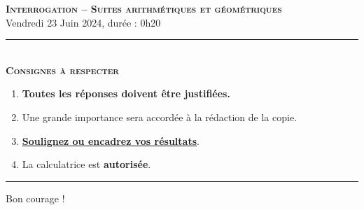 \documentclass[11pt]{article}
\begin{document}
%
%

\begin{center}
\textbf{\LARGE \textsc{Interrogation -- Suites arithmétiques et
géométriques}}\\[2mm]

{\large Vendredi 23 Juin 2024, durée : 0h20}\\[1mm]
\noindent\rule{8cm}{0.4pt}\\[1mm]
\textbf{\textsc{Consignes à respecter}}
\begin{enumerate}[label=\textbf{\arabic*/}]
\item \textbf{Toutes les réponses doivent être justifiées.}
\item Une grande importance sera accordée à la rédaction de la
  copie.
\item \underline{\textbf{Soulignez ou encadrez vos résultats}}.
\item La calculatrice est \textbf{autorisée}.
\end{enumerate}
\noindent\rule{12cm}{0.4pt}
\end{center}

\begin{center}
  Bon courage !
\end{center}
\end{document}
